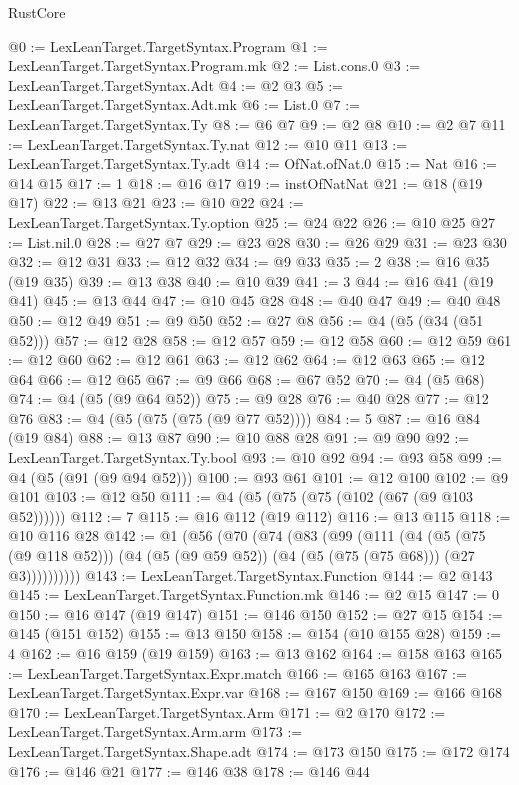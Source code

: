 \begin{lexlean}{RustCore}
\begin{coremodule}
@0 := LexLeanTarget.TargetSyntax.Program
@1 := LexLeanTarget.TargetSyntax.Program.mk
@2 := List.cons.{0}
@3 := LexLeanTarget.TargetSyntax.Adt
@4 := @2 @3
@5 := LexLeanTarget.TargetSyntax.Adt.mk
@6 := List.{0}
@7 := LexLeanTarget.TargetSyntax.Ty
@8 := @6 @7
@9 := @2 @8
@10 := @2 @7
@11 := LexLeanTarget.TargetSyntax.Ty.nat
@12 := @10 @11
@13 := LexLeanTarget.TargetSyntax.Ty.adt
@14 := OfNat.ofNat.{0}
@15 := Nat
@16 := @14 @15
@17 := 1
@18 := @16 @17
@19 := instOfNatNat
@21 := @18 (@19 @17)
@22 := @13 @21
@23 := @10 @22
@24 := LexLeanTarget.TargetSyntax.Ty.option
@25 := @24 @22
@26 := @10 @25
@27 := List.nil.{0}
@28 := @27 @7
@29 := @23 @28
@30 := @26 @29
@31 := @23 @30
@32 := @12 @31
@33 := @12 @32
@34 := @9 @33
@35 := 2
@38 := @16 @35 (@19 @35)
@39 := @13 @38
@40 := @10 @39
@41 := 3
@44 := @16 @41 (@19 @41)
@45 := @13 @44
@47 := @10 @45 @28
@48 := @40 @47
@49 := @40 @48
@50 := @12 @49
@51 := @9 @50
@52 := @27 @8
@56 := @4 (@5 (@34 (@51 @52)))
@57 := @12 @28
@58 := @12 @57
@59 := @12 @58
@60 := @12 @59
@61 := @12 @60
@62 := @12 @61
@63 := @12 @62
@64 := @12 @63
@65 := @12 @64
@66 := @12 @65
@67 := @9 @66
@68 := @67 @52
@70 := @4 (@5 @68)
@74 := @4 (@5 (@9 @64 @52))
@75 := @9 @28
@76 := @40 @28
@77 := @12 @76
@83 := @4 (@5 (@75 (@75 (@9 @77 @52))))
@84 := 5
@87 := @16 @84 (@19 @84)
@88 := @13 @87
@90 := @10 @88 @28
@91 := @9 @90
@92 := LexLeanTarget.TargetSyntax.Ty.bool
@93 := @10 @92
@94 := @93 @58
@99 := @4 (@5 (@91 (@9 @94 @52)))
@100 := @93 @61
@101 := @12 @100
@102 := @9 @101
@103 := @12 @50
@111 := @4 (@5 (@75 (@75 (@102 (@67 (@9 @103 @52))))))
@112 := 7
@115 := @16 @112 (@19 @112)
@116 := @13 @115
@118 := @10 @116 @28
@142 := @1
    (@56
      (@70
        (@74
          (@83
            (@99
              (@111
                (@4
                  (@5 (@75 (@9 @118 @52)))
                  (@4 (@5 (@9 @59 @52)) (@4 (@5 (@75 (@75 @68))) (@27 @3))))))))))
@143 := LexLeanTarget.TargetSyntax.Function
@144 := @2 @143
@145 := LexLeanTarget.TargetSyntax.Function.mk
@146 := @2 @15
@147 := 0
@150 := @16 @147 (@19 @147)
@151 := @146 @150
@152 := @27 @15
@154 := @145 (@151 @152)
@155 := @13 @150
@158 := @154 (@10 @155 @28)
@159 := 4
@162 := @16 @159 (@19 @159)
@163 := @13 @162
@164 := @158 @163
@165 := LexLeanTarget.TargetSyntax.Expr.match
@166 := @165 @163
@167 := LexLeanTarget.TargetSyntax.Expr.var
@168 := @167 @150
@169 := @166 @168
@170 := LexLeanTarget.TargetSyntax.Arm
@171 := @2 @170
@172 := LexLeanTarget.TargetSyntax.Arm.arm
@173 := LexLeanTarget.TargetSyntax.Shape.adt
@174 := @173 @150
@175 := @172 @174
@176 := @146 @21
@177 := @146 @38
@178 := @146 @44

\end{coremodule}
\end{lexlean}
